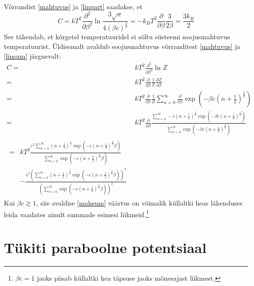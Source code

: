 \documentclass{trkut}%
\begin{document}
Võrrandist \eqref{mahtuvus} ja \eqref{linpart} saadakse, et
\begin{equation}
    C=kT^2 \frac{\partial^2}{\partial \beta^2} \ln \frac{3\sqrt{\pi}}{4(\beta c)^\frac{3}{2}}=-k_BT^2\frac{\partial}{\partial \beta} \frac{3}{2\beta}=\frac{3k_B}{2}
\end{equation}
See tähendab, et kõrgetel temperatuuridel ei sõltu süsteemi soojusmahtuvus temperatuurist.
Üldisemalt avaldub soojusmahtuvus võrranditest \eqref{mahtuvus} ja \eqref{linsum} järgnevalt:
\begin{align}
    C={}&kT^2 \frac{\partial^2}{\partial \beta^2} \ln Z \nonumber \\
    ={}&kT^2\frac{\partial}{\partial \beta}\frac{1}{Z} \frac{\partial Z}{\partial \beta} \nonumber \\
    ={}&kT^2\frac{\partial}{\partial \beta}\frac{1}{Z} \sum_{n=0}^{\infty} \frac{\partial}{\partial \beta} \exp \left( -\beta c \left(n+\frac{1}{2}\right)^\frac{2}{3} \right) \nonumber \\
    ={}&kT^2\frac{\partial}{\partial \beta} \frac{\sum_{n=0}^{\infty} -c\left(n+\frac{1}{2}\right)^\frac{2}{3} \exp \left( -\beta c \left(n+\frac{1}{2}\right)^\frac{2}{3} \right)}{\sum_{n=0}^{\infty} \exp \left( -\beta c \left(n+\frac{1}{2}\right)^\frac{2}{3} \right)} \nonumber \\
    \begin{split}\label{mahsum}
        ={}&kT^2 \frac{c^2 \sum_{n=0}^\infty \left( n+\frac{1}{2}\right)^\frac{4}{3} \exp \left( -c \left( n+\frac{1}{2} \right)^\frac{2}{3} \beta \right) }{\sum_{n=0}^\infty {{\exp}\left( -c {{\left( n+\frac{1}{2}\right) }^{\frac{2}{3}}} \beta \right)}}  \\
        & - \frac{c^2 \left( \sum_{n=0}^{\infty }{{{\left( n+\frac{1}{2}\right) }^{\frac{2}{3}}} {{ \exp}\left( -c {{\left( n+\frac{1}{2}\right) }^{\frac{2}{3}}} \beta \right)}}\right)^{2}}{{{\left( \sum_{n=0}^{\infty }{ {{\exp}\left( -c {{\left( n+\frac{1}{2}\right) }^{\frac{2}{3}}} \beta \right)}}\right) }^{2}}}
    \end{split}
\end{align}
Kui $\beta c \gtrsim 1$, siis avaldise \eqref{mahsum} väärtus on võimalik küllaltki heas lähenduses leida vaadates ainult summade esimesi liikmeid.\footnote{$\beta c =1$ jaoks piisab küllaltki hea täpsuse jaoks mõnesajast liikmest.}

\section{Tükiti paraboolne potentsiaal}
\end{document}
